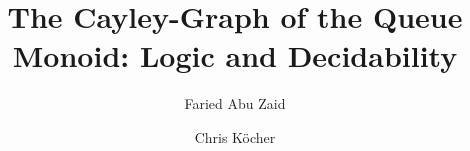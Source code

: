 \documentclass[a4paper,numberwithinsect,USenglish]{lipics-v2018}
\title{The Cayley-Graph of the Queue Monoid: Logic and Decidability}
\author{Faried Abu Zaid}{Technische Universität Ilmenau, Automata and Logics Group}{faried.abu-zaid@tu-ilmenau.de}{}{}
\author{Chris Köcher}{Technische Universität Ilmenau, Automata and Logics Group}{chris.koecher@tu-ilmenau.de}{https://orcid.org/0000-0003-4575-9339}{}
\theoremstyle{plain}
\theoremstyle{remark}
\begin{document}
	\maketitle

	\begin{abstract}
		
	\end{abstract}

	
	
	
	
	

	
	
	    
\end{document}
